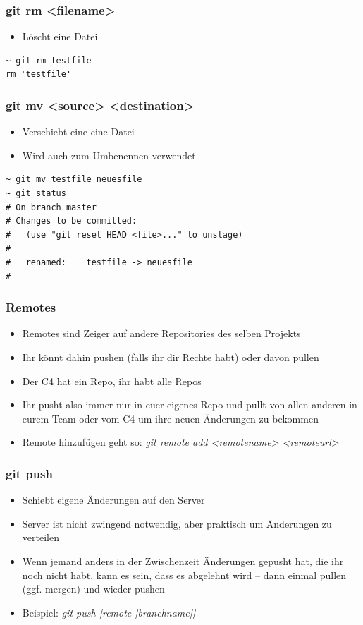 \documentclass[ngerman,compress]{beamer}
\begin{document}
\begin{frame} [fragile]
	\frametitle{git rm <filename>}
	\begin{itemize}
		\item Löscht eine Datei
	\end{itemize}
	\begin{lstlisting}
~ git rm testfile 
rm 'testfile'
	\end{lstlisting}
\end{frame}

\begin{frame} [fragile]
	\frametitle{git mv <source> <destination>}
	\begin{itemize}
		\item Verschiebt eine eine Datei
		\item Wird auch zum Umbenennen verwendet
	\end{itemize}
	\begin{lstlisting}
~ git mv testfile neuesfile
~ git status
# On branch master
# Changes to be committed:
#   (use "git reset HEAD <file>..." to unstage)
#
#	renamed:    testfile -> neuesfile
#
	\end{lstlisting}
\end{frame}

\begin{frame}
	\frametitle{Remotes}
	\begin{itemize}
		\item Remotes sind Zeiger auf andere Repositories des selben Projekts
		\item Ihr könnt dahin pushen (falls ihr dir Rechte habt) oder davon pullen
		\item Der C4 hat ein Repo, ihr habt alle Repos
		\item Ihr pusht also immer nur in euer eigenes Repo und pullt von allen anderen in eurem Team oder vom C4 um ihre neuen Änderungen zu bekommen
		\item Remote hinzufügen geht so: \emph{git remote add <remotename> <remoteurl>}
	\end{itemize}
\end{frame}

\begin{frame}
	\frametitle{git push}
	\begin{itemize}
		\item Schiebt eigene Änderungen auf den Server
		\item Server ist nicht zwingend notwendig, aber praktisch um Änderungen zu verteilen
		\item Wenn jemand anders in der Zwischenzeit Änderungen gepusht hat, die ihr noch nicht habt, kann es sein, dass es abgelehnt wird -- dann einmal pullen (ggf. mergen) und wieder pushen
		\item Beispiel: \emph{git push [remote [branchname]]}
	\end{itemize}
\end{frame}
\end{document}
